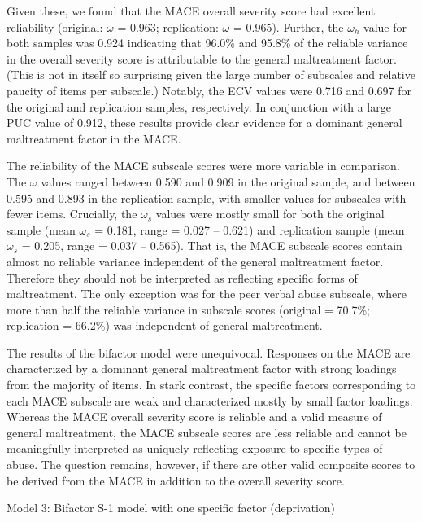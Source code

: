 \documentclass[letterpaper,man,natbib]{apa6}  %
\makeatletter
\renewcommand{\subsubsection}{\@startsection{subsubsection}{3}
  {\z@}%
  {\b@level@two@skip}{\e@level@two@skip}%
  {\normalfont\normalsize\bfseries}}
\makeatother
\begin{document}
Given these, we found that the MACE overall severity score had excellent reliability (original: $\omega$ = 0.963; replication: $\omega$ = 0.965). Further, the $\omega_h$ value for both samples was 0.924 indicating that 96.0\% and 95.8\% of the reliable variance in the overall severity score is attributable to the general maltreatment factor. (This is not in itself so surprising given the large number of subscales and relative paucity of items per subscale.) Notably, the ECV values were 0.716 and 0.697 for the original and replication samples, respectively. In conjunction with a large PUC value of 0.912, these results provide clear evidence for a dominant general maltreatment factor in the MACE. 

The reliability of the MACE subscale scores were more variable in comparison. The $\omega$ values ranged between 0.590 and 0.909 in the original sample, and between 0.595 and 0.893 in the replication sample, with smaller values for subscales with fewer items. Crucially, the $\omega_s$ values were mostly small for both the original sample (mean $\omega_s$ = 0.181, range = 0.027 -- 0.621) and replication sample (mean $\omega_s$ = 0.205, range = 0.037 -- 0.565). That is, the MACE subscale scores contain almost no reliable variance independent of the general maltreatment factor. Therefore they should not be interpreted as reflecting specific forms of maltreatment. The only exception was for the peer verbal abuse subscale, where more than half the reliable variance in subscale scores (original = 70.7\%; replication = 66.2\%) was independent of general maltreatment.

The results of the bifactor model were unequivocal. Responses on the MACE are characterized by a dominant general maltreatment factor with strong loadings from the majority of items. In stark contrast, the specific factors corresponding to each MACE subscale are weak and characterized mostly by small factor loadings. Whereas the MACE overall severity score is reliable and a valid measure of general maltreatment, the MACE subscale scores are less reliable and cannot be meaningfully interpreted as uniquely reflecting exposure to specific types of abuse. The question remains, however, if there are other valid composite scores to be derived from the MACE in addition to the overall severity score.

\subsubsection{Model 3: Bifactor S-1 model with one specific factor (deprivation)}
\end{document}
